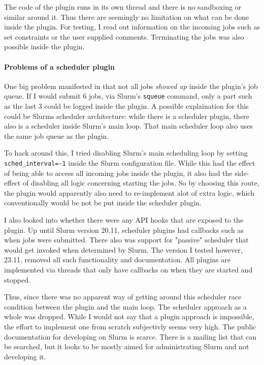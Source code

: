 The code of the plugin runs in its own thread and there is no sandboxing or similar around it.
Thus there are seemingly no limitation on what can be done inside the plugin. 
For testing, I read out information on the incoming jobs such as set constraints or the user supplied comments. Terminating the jobs was also possible inside the plugin.

\paragraph{Problems of a scheduler plugin}

One big problem manifested in that not all jobs \emph{showed up} inside the plugin's job queue. 
If I would submit 6 jobs, via Slurm's \verb|squeue| command, only a part such as the last 3 could be logged inside the plugin.
A possible explaination for this could be Slurms scheduler architecture: while there is a scheduler plugin, there also is a scheduler inside Slurm's main loop. 
That main scheduler loop also uses the same job queue as the plugin.

To hack around this, I tried disabling Slurm's main scheduling loop by setting \verb|sched_interval=-1| inside the Slurm configuration file. 
While this had the effect of being able to access all incoming jobs inside the plugin, it also had the side-effect of disabling all logic concerning starting the jobs.
So by choosing this route, the plugin would apparently also need to re-implement alot of extra logic, which conventionally would be not be put inside the scheduler plugin. 

I also looked into whether there were any API hooks that are exposed to the plugin. 
Up until Slurm version 20.11, scheduler plugins had callbacks such as when jobs were submitted. There also was support for "passive" scheduler that would get invoked when determined by Slurm.
The version I tested however,  23.11, removed all such functionality and documentation. All plugins are implemented via threads that only have callbacks on when they are started and stopped.

Thus, since there was no apparent way of getting around this scheduler race condition between the plugin and the main loop. 
The scheduler approach as a whole was dropped. 
While I would not say that a plugin approach is impossible, the effort to implement one from scratch subjectivly seems very high. 
The public documentation for developing on Slurm is scarce. 
There is a mailing list that can be searched, but it looks to be mostly aimed for administrating Slurm and not developing it.

